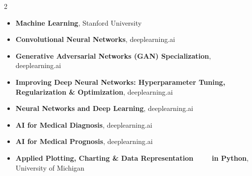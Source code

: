 
\newcommand{\certpoint}[2]{
    \noindent
    {\color{black}\fontsize{10pt}{1em}\bfseries{#1}}, 
    {\color{black}\small{#2}}
}

\vspace{-4mm}
{
\color{black}
\fontsize{10pt}{1em} 
\begin{multicols}{2}
\begin{itemize}[leftmargin=*]
    \item[\textcolor{awesome-red}{\Large{\textbf{\textbullet}}}] \certpoint{Machine Learning}{Stanford University}                                                                      
    \item[\textcolor{awesome-red}{\Large{\textbf{\textbullet}}}] \certpoint{Convolutional Neural Networks}{deeplearning.ai}                                                         
    \item[\textcolor{awesome-red}{\Large{\textbf{\textbullet}}}] \certpoint{Generative Adversarial Networks (GAN) Specialization}{deeplearning.ai}                                  
    \item[\textcolor{awesome-red}{\Large{\textbf{\textbullet}}}] \certpoint{Improving Deep Neural Networks: Hyperparameter Tuning, Regularization \& Optimization}{deeplearning.ai} 
    \item[\textcolor{awesome-red}{\Large{\textbf{\textbullet}}}] \certpoint{Neural Networks and Deep Learning}{deeplearning.ai}                                                     
    \item[\textcolor{awesome-red}{\Large{\textbf{\textbullet}}}] \certpoint{AI for Medical Diagnosis}{deeplearning.ai}                                                              
    \item[\textcolor{awesome-red}{\Large{\textbf{\textbullet}}}] \certpoint{AI for Medical Prognosis}{deeplearning.ai}                                                              
    \item[\textcolor{awesome-red}{\Large{\textbf{\textbullet}}}] \certpoint{Applied Plotting, Charting \& Data Representation ~~~~\linebreak in Python}{University of Michigan}            
\end{itemize}
\end{multicols}
\vspace{-3mm}
}